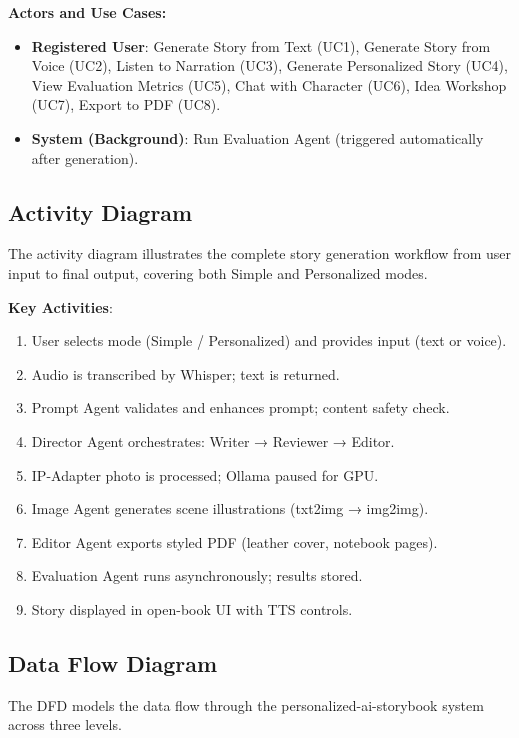 \textbf{Actors and Use Cases:}
\begin{itemize}
    \item \textbf{Registered User}: Generate Story from Text (UC1), Generate Story from Voice (UC2), Listen to Narration (UC3), Generate Personalized Story (UC4), View Evaluation Metrics (UC5), Chat with Character (UC6), Idea Workshop (UC7), Export to PDF (UC8).
    \item \textbf{System (Background)}: Run Evaluation Agent (triggered automatically after generation).
\end{itemize}

\subsection{Activity Diagram}

The activity diagram illustrates the complete story generation workflow from user input to final output, covering both Simple and Personalized modes.

\textbf{Key Activities}:
\begin{enumerate}
    \item User selects mode (Simple / Personalized) and provides input (text or voice).
    \item [STT path] Audio is transcribed by Whisper; text is returned.
    \item Prompt Agent validates and enhances prompt; content safety check.
    \item Director Agent orchestrates: Writer → Reviewer → Editor.
    \item [Personalized path] IP-Adapter photo is processed; Ollama paused for GPU.
    \item Image Agent generates scene illustrations (txt2img → img2img).
    \item Editor Agent exports styled PDF (leather cover, notebook pages).
    \item Evaluation Agent runs asynchronously; results stored.
    \item Story displayed in open-book UI with TTS controls.
\end{enumerate}

\subsection{Data Flow Diagram}

The DFD models the data flow through the personalized-ai-storybook system across three levels.

